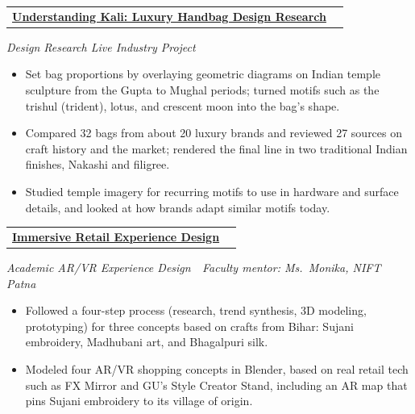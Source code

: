 \documentclass[10pt,letterpaper]{article}
\makeatletter
\newcommand{\weblink}[2]{\href{#1}{\textbf{#2}}}
\newenvironment{spread}[2][\normalsize]{\par\begingroup\linespread{#2}#1\selectfont}{\par\endgroup}
\newcommand{\entry}[2]{%
  \par\noindent
  \begin{tabularx}{\linewidth}{@{}X r@{}}
    \textbf{#1} & \normalfont #2
  \end{tabularx}\par
}
\newcommand{\entrygap}{\vspace{5pt}}
\newcommand{\subline}[1]{{\setlength{\rightskip}{2.7em}\itshape\small #1\par}\vspace{1pt}}
\makeatother
\begin{document}
\begin{spread}{1.07}
\ifdefined\EDRES\else
\entrygap
{}
\entry{\weblink{https://drive.google.com/file/d/1EOxRlg-zcMgTY221rpN7HIs18QQ0vArc/view?usp=sharing}{Understanding Kali: Luxury Handbag Design Research}}{2023}
\subline{Design Research Live Industry Project}
\begin{itemize}
  \item Set bag proportions by overlaying geometric diagrams on Indian temple sculpture from the Gupta to Mughal periods; turned motifs such as the trishul (trident), lotus, and crescent moon into the bag's shape.
  \item Compared 32 bags from about 20 luxury brands and reviewed 27 sources on craft history and the market; rendered the final line in two traditional Indian finishes, Nakashi and filigree.
  \item Studied temple imagery for recurring motifs to use in hardware and surface details, and looked at how brands adapt similar motifs today.
\end{itemize}
\fi

\entrygap
{}
\entry{\weblink{https://www.behance.net/gallery/248581343/Immersive-Retail-Experience-Design}{Immersive Retail Experience Design}}{2023}
\subline{Academic AR/VR Experience Design~\textbar\ Faculty mentor: Ms.\ Monika, NIFT Patna}
\begin{itemize}
  \item Followed a four-step process (research, trend synthesis, 3D modeling, prototyping) for three concepts based on crafts from Bihar: Sujani embroidery, Madhubani art, and Bhagalpuri silk.
  \item Modeled four AR/VR shopping concepts in Blender, based on real retail tech such as FX Mirror and GU's Style Creator Stand, including an AR map that pins Sujani embroidery to its village of origin.
\end{itemize}

\end{spread}
\clearpage
\end{document}
